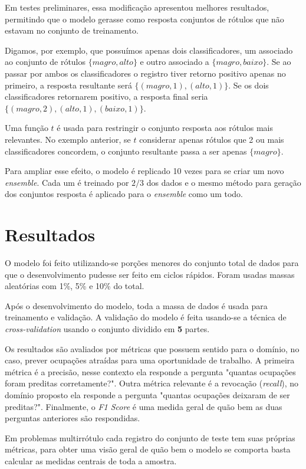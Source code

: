 \documentclass[runningheads,a4paper]{llncs}
\begin{document}
Em testes preliminares, essa modificação apresentou melhores resultados, permitindo que o modelo gerasse como resposta conjuntos de rótulos que não estavam no conjunto de treinamento.

Digamos, por exemplo, que possuímos apenas dois classificadores, um associado ao conjunto de rótulos $\{magro, alto\}$ e outro associado a $\{magro, baixo\}$. Se ao passar por ambos os classificadores o registro tiver retorno positivo apenas no primeiro, a resposta resultante será $\{(magro, 1), (alto, 1)\}$. Se os dois classificadores retornarem positivo, a resposta final seria $\{(magro, 2), (alto, 1), (baixo, 1)\}$.

Uma função $t$ é usada para restringir o conjunto resposta aos rótulos mais relevantes. No exemplo anterior, se $t$ considerar apenas rótulos que 2 ou mais classificadores concordem, o conjunto resultante passa a ser apenas $\{magro\}$.

Para ampliar esse efeito, o modelo é replicado 10 vezes para se criar um novo \textit{ensemble}. Cada um é treinado por $2/3$ dos dados e o mesmo método para geração dos conjuntos resposta é aplicado para o \textit{ensemble} como um todo.

\section{Resultados} \label{sec:resultados}

O modelo foi feito utilizando-se porções menores do conjunto total de dados para que o desenvolvimento pudesse ser feito em ciclos rápidos. Foram usadas massas aleatórias com 1\%, 5\% e 10\% do total.

Após o desenvolvimento do modelo, toda a massa de dados é usada para treinamento e validação. A validação do modelo é feita usando-se a técnica de \textit{cross-validation} \cite{Kohavi95-as} usando o conjunto dividido em \textbf{5} partes.

Os resultados são avaliados por métricas que possuem sentido para o domínio, no caso, prever ocupações atraídas para uma oportunidade de trabalho. A primeira métrica é a precisão, nesse contexto ela responde a pergunta "quantas ocupações foram preditas corretamente?". Outra métrica relevante é a revocação (\textit{recall}), no domínio proposto ela responde a pergunta "quantas ocupações deixaram de ser preditas?". Finalmente, o \textit{F1 Score} é uma medida geral de quão bem as duas perguntas anteriores são respondidas.

Em problemas multirrótulo cada registro do conjunto de teste tem suas próprias métricas, para obter uma visão geral de quão bem o modelo se comporta basta calcular as medidas centrais de toda a amostra.
\end{document}
